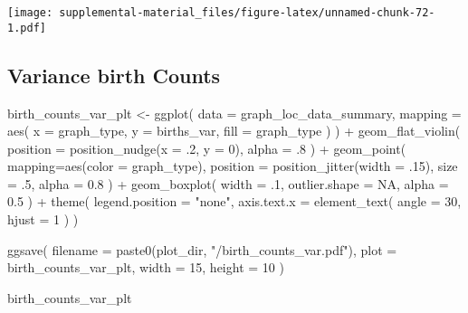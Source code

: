 \documentclass[
]{book}
\newenvironment{Shaded}{\begin{snugshade}}{\end{snugshade}}
\newcommand{\AttributeTok}[1]{\textcolor[rgb]{0.77,0.63,0.00}{#1}}
\newcommand{\ConstantTok}[1]{\textcolor[rgb]{0.00,0.00,0.00}{#1}}
\newcommand{\DecValTok}[1]{\textcolor[rgb]{0.00,0.00,0.81}{#1}}
\newcommand{\FloatTok}[1]{\textcolor[rgb]{0.00,0.00,0.81}{#1}}
\newcommand{\FunctionTok}[1]{\textcolor[rgb]{0.00,0.00,0.00}{#1}}
\newcommand{\NormalTok}[1]{#1}
\newcommand{\OtherTok}[1]{\textcolor[rgb]{0.56,0.35,0.01}{#1}}
\newcommand{\SpecialCharTok}[1]{\textcolor[rgb]{0.00,0.00,0.00}{#1}}
\newcommand{\StringTok}[1]{\textcolor[rgb]{0.31,0.60,0.02}{#1}}
\begin{document}
\texttt{[image: supplemental-material\_files/figure-latex/unnamed-chunk-72-1.pdf]}

\hypertarget{variance-birth-counts}{%
\subsection{Variance birth Counts}\label{variance-birth-counts}}

\begin{Shaded}
\begin{Highlighting}[]
\NormalTok{birth\_counts\_var\_plt }\OtherTok{\textless{}{-}} \FunctionTok{ggplot}\NormalTok{(}
    \AttributeTok{data =}\NormalTok{ graph\_loc\_data\_summary,}
    \AttributeTok{mapping =} \FunctionTok{aes}\NormalTok{(}
      \AttributeTok{x =}\NormalTok{ graph\_type,}
      \AttributeTok{y =}\NormalTok{ births\_var,}
      \AttributeTok{fill =}\NormalTok{ graph\_type}
\NormalTok{    )}
\NormalTok{  ) }\SpecialCharTok{+}
  \FunctionTok{geom\_flat\_violin}\NormalTok{(}
    \AttributeTok{position =} \FunctionTok{position\_nudge}\NormalTok{(}\AttributeTok{x =}\NormalTok{ .}\DecValTok{2}\NormalTok{, }\AttributeTok{y =} \DecValTok{0}\NormalTok{),}
    \AttributeTok{alpha =}\NormalTok{ .}\DecValTok{8}
\NormalTok{  ) }\SpecialCharTok{+}
  \FunctionTok{geom\_point}\NormalTok{(}
    \AttributeTok{mapping=}\FunctionTok{aes}\NormalTok{(}\AttributeTok{color =}\NormalTok{ graph\_type),}
    \AttributeTok{position =} \FunctionTok{position\_jitter}\NormalTok{(}\AttributeTok{width =}\NormalTok{ .}\DecValTok{15}\NormalTok{),}
    \AttributeTok{size =}\NormalTok{ .}\DecValTok{5}\NormalTok{,}
    \AttributeTok{alpha =} \FloatTok{0.8}
\NormalTok{  ) }\SpecialCharTok{+}
  \FunctionTok{geom\_boxplot}\NormalTok{(}
    \AttributeTok{width =}\NormalTok{ .}\DecValTok{1}\NormalTok{,}
    \AttributeTok{outlier.shape =} \ConstantTok{NA}\NormalTok{,}
    \AttributeTok{alpha =} \FloatTok{0.5}
\NormalTok{  ) }\SpecialCharTok{+}
  \FunctionTok{theme}\NormalTok{(}
    \AttributeTok{legend.position =} \StringTok{"none"}\NormalTok{,}
    \AttributeTok{axis.text.x =} \FunctionTok{element\_text}\NormalTok{(}
      \AttributeTok{angle =} \DecValTok{30}\NormalTok{,}
      \AttributeTok{hjust =} \DecValTok{1}
\NormalTok{    )}
\NormalTok{  )}

\FunctionTok{ggsave}\NormalTok{(}
  \AttributeTok{filename =} \FunctionTok{paste0}\NormalTok{(plot\_dir, }\StringTok{"/birth\_counts\_var.pdf"}\NormalTok{),}
  \AttributeTok{plot =}\NormalTok{ birth\_counts\_var\_plt,}
  \AttributeTok{width =} \DecValTok{15}\NormalTok{,}
  \AttributeTok{height =} \DecValTok{10}
\NormalTok{)}

\NormalTok{birth\_counts\_var\_plt}
\end{Highlighting}
\end{Shaded}
\end{document}
